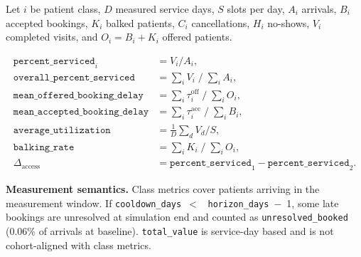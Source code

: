 \documentclass[11pt]{article}
\begin{document}
Let $i$ be patient class, $D$ measured service days, $S$ slots per day,
$A_i$ arrivals, $B_i$ accepted bookings, $K_i$ balked patients, $C_i$
cancellations, $H_i$ no-shows, $V_i$ completed visits, and $O_i = B_i +
K_i$ offered patients.

\begin{align*}
\texttt{percent\_serviced}_i &= V_i / A_i, \\
\texttt{overall\_percent\_serviced} &= \textstyle\sum_i V_i \;/\; \textstyle\sum_i A_i, \\
\texttt{mean\_offered\_booking\_delay} &= \textstyle\sum_i \tau^{\text{off}}_i \;/\; \textstyle\sum_i O_i, \\
\texttt{mean\_accepted\_booking\_delay} &= \textstyle\sum_i \tau^{\text{acc}}_i \;/\; \textstyle\sum_i B_i, \\
\texttt{average\_utilization} &= \tfrac{1}{D}\textstyle\sum_d V_d / S, \\
\texttt{balking\_rate} &= \textstyle\sum_i K_i \;/\; \textstyle\sum_i O_i, \\
\Delta_{\text{access}} &= \texttt{percent\_serviced}_1 - \texttt{percent\_serviced}_2.
\end{align*}

\noindent\textbf{Measurement semantics.} Class metrics cover patients
arriving in the measurement window. If \texttt{cooldown\_days}~$<$~%
\texttt{horizon\_days}~$-$~1, some late bookings are unresolved at
simulation end and counted as \texttt{unresolved\_booked} (0.06\% of
arrivals at baseline). \texttt{total\_value} is service-day based and
is not cohort-aligned with class metrics.
\end{document}
